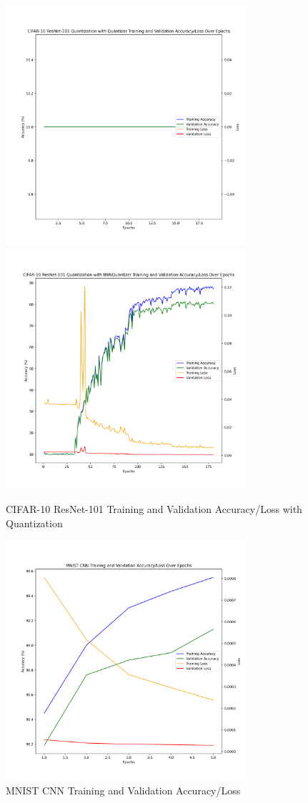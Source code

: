 \documentclass{article}
\begin{document}
\begin{figure}
    \centerline{\includegraphics[width=3.5in]{../proj2/figures/cifar10_resnet101_QAT_Quantizer.png}\includegraphics[width=3.5in]{../proj2/figures/cifar10_resnet101_BNNQuantizer.png}}
    \caption{CIFAR-10 ResNet-101 Training and Validation Accuracy/Loss with Quantization}
    \label{fig:resnet-charts}
\end{figure}


\begin{figure}
    \centerline{\includegraphics[width=3.5in]{../proj2/figures/mnist_baseline.png}}
    \caption{MNIST CNN Training and Validation Accuracy/Loss}
    \label{fig:mnist-charts-nq}
\end{figure}
\end{document}
